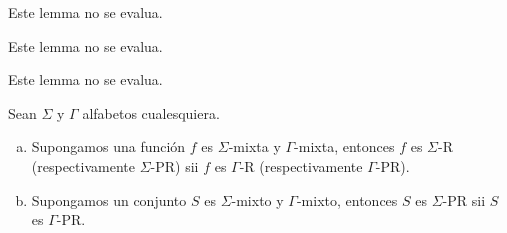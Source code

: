   \begin{lemma}
    \par Este lemma no se evalua.
  \end{lemma}

  \begin{lemma}
    \par Este lemma no se evalua.
  \end{lemma}

  \begin{lemma}
    \par Este lemma no se evalua.
  \end{lemma}

  \begin{theorem}
    \par Sean $\Sigma$ y $\Gamma$ alfabetos cualesquiera.

    \begin{enumerate}[a)]
      \item Supongamos una función $f$ es $\Sigma$-mixta y $\Gamma$-mixta, entonces $f$ es $\Sigma$-R (respectivamente
        $\Sigma$-PR) sii $f$ es $\Gamma$-R (respectivamente $\Gamma$-PR).
      \item Supongamos un conjunto $S$ es $\Sigma$-mixto y $\Gamma$-mixto, entonces $S$ es $\Sigma$-PR sii $S$ es
        $\Gamma$-PR.
    \end{enumerate}
  \end{theorem}

